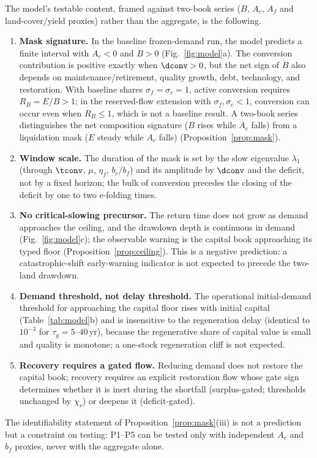 The model's testable content, framed against two-book series ($B$, $A_c$, $A_f$ and land-cover/yield proxies) rather than the aggregate, is the following.
\begin{enumerate}[label=P\arabic*.,leftmargin=2.2em]
\item \textbf{Mask signature.} In the baseline frozen-demand run, the model predicts a finite interval with $\dot A_c<0$ and $\dot B>0$ (Fig.~\ref{fig:model}a). The conversion contribution is positive exactly when $\dconv>0$, but the net sign of $\dot B$ also depends on maintenance/retirement, quality growth, debt, technology, and restoration. With baseline shares $\sigma_f=\sigma_c=1$, active conversion requires $R_B=E/B>1$; in the reserved-flow extension with $\sigma_f,\sigma_c<1$, conversion can occur even when $R_B\le1$, which is not a baseline result. A two-book series distinguishes the net composition signature ($B$ rises while $A_c$ falls) from a liquidation mask ($E$ steady while $A_c$ falls) (Proposition~\ref{prop:mask}).
\item \textbf{Window scale.} The duration of the mask is set by the slow eigenvalue $\lambda_1$ (through $\tconv$, $\mu$, $\eta_f$, $b_c/b_f$) and its amplitude by $\dconv$ and the deficit, not by a fixed horizon; the bulk of conversion precedes the closing of the deficit by one to two e-folding times.
\item \textbf{No critical-slowing precursor.} The return time does not grow as demand approaches the ceiling, and the drawdown depth is continuous in demand (Fig.~\ref{fig:model}c); the observable warning is the capital book approaching its typed floor (Proposition~\ref{prop:ceiling}). This is a negative prediction: a catastrophic-shift early-warning indicator is not expected to precede the two-land drawdown.
\item \textbf{Demand threshold, not delay threshold.} The operational initial-demand threshold for approaching the capital floor rises with initial capital (Table~\ref{tab:model}b) and is insensitive to the regeneration delay (identical to $10^{-3}$ for $\tau_g=5$--$40$\,yr), because the regenerative share of capital value is small and quality is monotone; a one-stock regeneration cliff is not expected.
\item \textbf{Recovery requires a gated flow.} Reducing demand does not restore the capital book; recovery requires an explicit restoration flow whose gate sign determines whether it is inert during the shortfall (surplus-gated; thresholds unchanged by $\chi_r$) or deepens it (deficit-gated).
\end{enumerate}
The identifiability statement of Proposition~\ref{prop:mask}(iii) is not a prediction but a constraint on testing: P1--P5 can be tested only with independent $A_c$ and $b_f$ proxies, never with the aggregate alone.
